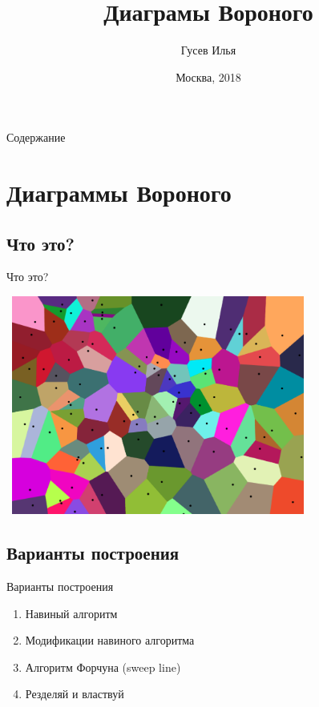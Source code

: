 \documentclass[10pt]{beamer}
\title[\href{https://goo.gl/NRgp8K}{https://goo.gl/NRgp8K} (Term 3)]{Диаграмы Вороного}
\author[Гусев Илья]{Гусев Илья}
\institute[МФТИ] 
{Московский физико-технический институт\\*}
\date{Москва, 2018}
\begin{document}
\begin{frame}
  \titlepage
\end{frame}

\begin{frame}{Содержание}
\tableofcontents
\end{frame}

\section{Диаграммы Вороного}
\subsection{Что это?}
\begin{frame}[fragile]{Что это?}
\begin{center}
    \includegraphics[width=10cm, height=7.2cm]{Term_3/Source/Pictures/voronoi_example.png}
\end{center}
\end{frame}

\subsection{Варианты построения}
\begin{frame}[fragile]{Варианты построения}
\begin{enumerate}
    \item Навиный алгоритм
    \item Модификации навиного алгоритма
    \item Алгоритм Форчуна (sweep line)
    \item Резделяй и властвуй
\end{enumerate}
\end{frame}
\end{document}
